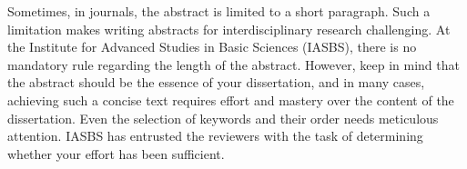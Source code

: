 Sometimes, in journals, the abstract is limited to a short paragraph. Such a limitation makes writing abstracts for interdisciplinary research challenging. At the Institute for Advanced Studies in Basic Sciences (IASBS), there is no mandatory rule regarding the length of the abstract. However, keep in mind that the abstract should be the essence of your dissertation, and in many cases, achieving such a concise text requires effort and mastery over the content of the dissertation. Even the selection of keywords and their order needs meticulous attention. IASBS has entrusted the reviewers with the task of determining whether your effort has been sufficient.
